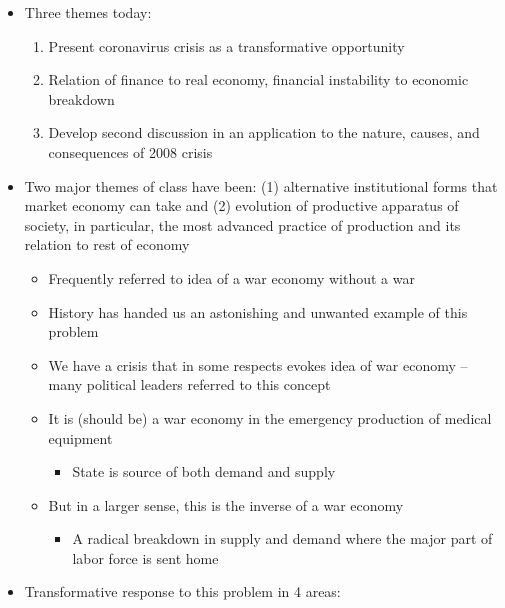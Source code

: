 \begin{itemize}
\tightlist
\item
  Three themes today:

  \begin{enumerate}
  \def\labelenumi{\arabic{enumi}.}
  \tightlist
  \item
    Present coronavirus crisis as a transformative opportunity
  \item
    Relation of finance to real economy, financial instability to
    economic breakdown
  \item
    Develop second discussion in an application to the nature, causes,
    and consequences of 2008 crisis
  \end{enumerate}
\item
  Two major themes of class have been: (1) alternative institutional
  forms that market economy can take and (2) evolution of productive
  apparatus of society, in particular, the most advanced practice of
  production and its relation to rest of economy

  \begin{itemize}
  \tightlist
  \item
    Frequently referred to idea of a war economy without a war
  \item
    History has handed us an astonishing and unwanted example of this
    problem
  \item
    We have a crisis that in some respects evokes idea of war economy --
    many political leaders referred to this concept
  \item
    It is (should be) a war economy in the emergency production of
    medical equipment

    \begin{itemize}
    \tightlist
    \item
      State is source of both demand and supply
    \end{itemize}
  \item
    But in a larger sense, this is the inverse of a war economy

    \begin{itemize}
    \tightlist
    \item
      A radical breakdown in supply and demand where the major part of
      labor force is sent home
    \end{itemize}
  \end{itemize}
\item
  Transformative response to this problem in 4 areas:


\end{itemize}
